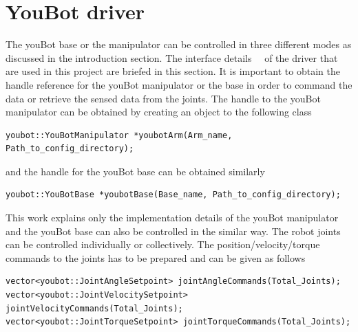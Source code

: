  
\appendix    %
\let\cleardoublepage\clearpage
\chapter{YouBot driver}
\label{sec:appendixA}
The youBot base or the manipulator can be controlled in three different modes as discussed in the introduction section. The interface details~\cite{youbotdriver}~\cite{youbotdriver_architecture} of the driver that are used in this project are briefed in this section. It is important to obtain the handle reference for the youBot manipulator or the base in order to command the data or retrieve the sensed data from the joints. The handle to the youBot manipulator can be obtained by creating an object to the following class

\begin{verbatim}
youbot::YouBotManipulator *youbotArm(Arm_name, Path_to_config_directory);
\end{verbatim}

and the handle for the youBot base can be obtained similarly

\begin{verbatim}
youbot::YouBotBase *youbotBase(Base_name, Path_to_config_directory);
\end{verbatim}

This work explains only the implementation details of the youBot manipulator and the youBot base can also be controlled in the similar way. The robot joints can be controlled individually or collectively. The position/velocity/torque commands to the joints has to be prepared and can be given as follows

\begin{verbatim}
vector<youbot::JointAngleSetpoint> jointAngleCommands(Total_Joints);
vector<youbot::JointVelocitySetpoint> jointVelocityCommands(Total_Joints);
vector<youbot::JointTorqueSetpoint> jointTorqueCommands(Total_Joints);
\end{verbatim}

